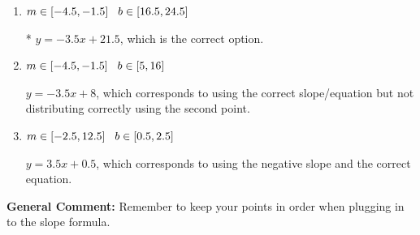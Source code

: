 \documentclass{extbook}[14pt]
\begin{document}
\begin{enumerate}
{\begin{enumerate}[label=\Alph*.]
 $y = -3.5x -19$, which corresponds to using the correct slope/equation but not distributing correctly using the first point.
\item \( m \in [-4.5, -1.5] \hspace*{3mm} b \in [16.5, 24.5] \)

* $y = -3.5x + 21.5$, which is the correct option.
\item \( m \in [-4.5, -1.5] \hspace*{3mm} b \in [5, 16] \)

 $y = -3.5x + 8$, which corresponds to using the correct slope/equation but not distributing correctly using the second point.
\item \( m \in [-2.5, 12.5] \hspace*{3mm} b \in [0.5, 2.5] \)

 $y = 3.5x + 0.5$, which corresponds to using the negative slope and the correct equation.
\end{enumerate}

\textbf{General Comment:} Remember to keep your points in order when plugging in to the slope formula.
}
\end{enumerate}
\end{document}
